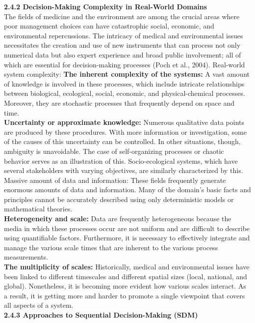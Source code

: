 \documentclass[a4paper,11pt,onecolumn]{article}
\begin{document}
\textbf{2.4.2 Decision-Making Complexity in Real-World Domains}\\
The fields of medicine and the environment are among the crucial areas where poor management choices can have catastrophic social, economic, and environmental repercussions. The intricacy of medical and environmental issues necessitates the creation and use of new instruments that can process not only numerical data but also expert experience and broad public involvement; all of which are essential for decision-making processes (Poch et al., 2004). Real-world system complexity: 
\textbf{The inherent complexity of the systems:} A vast amount of knowledge is involved in these processes, which include intricate relationships between biological, ecological, social, economic, and physical-chemical processes. Moreover, they are stochastic processes that frequently depend on space and time.\\
\textbf{Uncertainty or approximate knowledge:} Numerous qualitative data points are produced by these procedures. With more information or investigation, some of the causes of this uncertainty can be controlled. In other situations, though, ambiguity is unavoidable. The case of self-organizing processes or chaotic behavior serves as an illustration of this. Socio-ecological systems, which have several stakeholders with varying objectives, are similarly characterized by this.  Massive amount of data and information: These fields frequently generate enormous amounts of data and information. Many of the domain's basic facts and principles cannot be accurately described using only deterministic models or mathematical theories.\\
\textbf{Heterogeneity and scale:} Data are frequently heterogeneous because the media in which these processes occur are not uniform and are difficult to describe using quantifiable factors. Furthermore, it is necessary to effectively integrate and manage the various scale times that are inherent to the various process measurements.\\
\textbf{The multiplicity of scales:} Historically, medical and environmental issues have been linked to different timescales and different spatial sizes (local, national, and global). Nonetheless, it is becoming more evident how various scales interact. As a result, it is getting more and harder to promote a single viewpoint that covers all aspects of a system. \newline \\
\textbf{2.4.3 Approaches to Sequential Decision-Making (SDM)}
\end{document}
